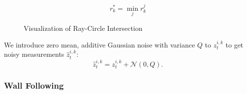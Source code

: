 \begin{equation}
r_k^*=\min_{j} r_{k}^j
\end{equation}


\begin{figure}[ht]
\centering
{}
\caption{Visualization of Ray-Circle Intersection}
\label{fig:raycirc}
\end{figure}

We introduce zero mean, additive Gaussian noise with variance $Q$ to $z_t^{i,k}$ to get noisy measurements $\hat{z}_t^{i,k}$:
\begin{equation}
\hat{z}_t^{i,k}=z_t^{i,k}+\mathcal{N}(0,Q).
\end{equation}

\subsubsection{Wall Following}

